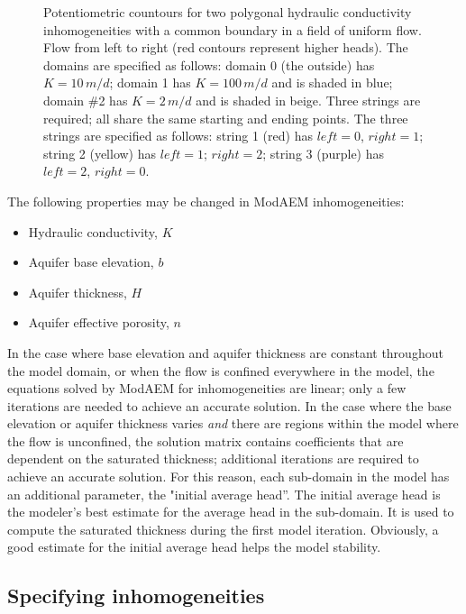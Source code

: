 \begin{figure}
	\begin{centering}
	\end{centering}
	\caption{\label{cap:in0-strings}Potentiometric countours for two polygonal hydraulic conductivity inhomogeneities with a common boundary in a field of uniform flow. Flow from left to right (red contours represent higher heads). The domains are specified as follows: domain 0 (the outside) has $K=10\, m/d$; domain 1 has $K=100\, m/d$ and is shaded in blue; domain \#2 has $K=2\, m/d$ and is shaded in beige. Three strings are required; all share the same starting and ending points. The three strings are specified as follows: string 1 (red) has $left=0$, $right=1$; string 2 (yellow) has $left=1$; $right=2$; string 3 (purple) has $left=2$, $right=0$.}
\end{figure}
The following properties may be changed in ModAEM inhomogeneities:
\begin{itemize}
\item Hydraulic conductivity, $K$
\item Aquifer base elevation, $b$ 
\item Aquifer thickness, $H$
\item Aquifer effective porosity, $n$
\end{itemize}
In the case where base elevation and aquifer thickness are constant throughout the model domain, or when the flow is confined everywhere in the model, the equations solved by ModAEM for inhomogeneities are linear; only a few iterations are needed to achieve an accurate solution. In the case where the base elevation or aquifer thickness varies \emph{and} there are regions within the model where the flow is unconfined, the solution matrix contains coefficients that are dependent on the saturated thickness; additional iterations are required to achieve an accurate solution. For this reason, each sub-domain in the model has an additional parameter, the "initial average head''. The initial average head is the modeler's best estimate for the average head in the sub-domain. It is used to compute the saturated thickness during the first model iteration. Obviously, a good estimate for the initial average head helps the model stability.

\subsection{Specifying inhomogeneities}


